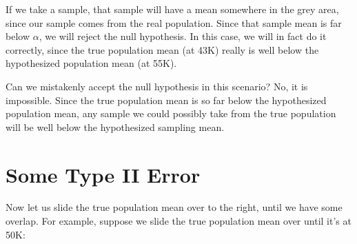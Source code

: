 \documentclass[../../../main.tex]{subfiles}
\begin{document}
\begin{center}
\end{center}

\noindent
If we take a sample, that sample will have a mean somewhere in the grey area, since our sample comes from the real population. Since that sample mean is far below $\alpha$, we will reject the null hypothesis. In this case, we will in fact do it correctly, since the true population mean (at 43K) really is well below the hypothesized population mean (at 55K).

Can we mistakenly accept the null hypothesis in this scenario? No, it is impossible. Since the true population mean is so far below the hypothesized population mean, any sample we could possibly take from the true population will be well below the hypothesized sampling mean.


\section{Some Type II Error}

Now let us slide the true population mean over to the right, until we have some overlap. For example, suppose we slide the true population mean over until it's at 50K:
\end{document}
